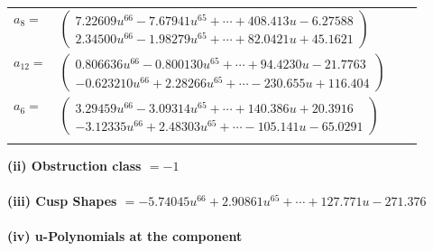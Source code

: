 \documentclass[1p]{elsarticle_modified}
\theoremstyle{definition}
\begin{document}
\begin{tabular}{m{7pt} m{180pt} m{7pt} m{180pt} }
\flushright $a_{8}=$&$\begin{pmatrix}7.22609 u^{66}-7.67941 u^{65}+\cdots+408.413 u-6.27588\\2.34500 u^{66}-1.98279 u^{65}+\cdots+82.0421 u+45.1621\end{pmatrix}$ \\
\flushright $a_{12}=$&$\begin{pmatrix}0.806636 u^{66}-0.800130 u^{65}+\cdots+94.4230 u-21.7763\\-0.623210 u^{66}+2.28266 u^{65}+\cdots-230.655 u+116.404\end{pmatrix}$ \\
\flushright $a_{6}=$&$\begin{pmatrix}3.29459 u^{66}-3.09314 u^{65}+\cdots+140.386 u+20.3916\\-3.12335 u^{66}+2.48303 u^{65}+\cdots-105.141 u-65.0291\end{pmatrix}$\\&\end{tabular}
\flushleft \textbf{(ii) Obstruction class $= -1$}\\~\\
\flushleft \textbf{(iii) Cusp Shapes $= -5.74045 u^{66}+2.90861 u^{65}+\cdots+127.771 u-271.376$}\\~\\
\newpage\renewcommand{\arraystretch}{1}
\flushleft \textbf{(iv) u-Polynomials at the component}\newline \\
\end{document}
